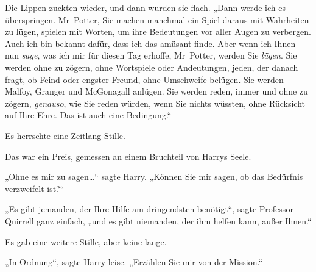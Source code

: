 Die Lippen zuckten wieder, und dann wurden sie flach. „Dann werde ich es überspringen. Mr~Potter, Sie machen manchmal ein Spiel daraus mit Wahrheiten zu lügen, spielen mit Worten, um ihre Bedeutungen vor aller Augen zu verbergen. Auch ich bin bekannt dafür, dass ich das amüsant finde. Aber wenn ich Ihnen nun \emph{sage}, was ich mir für diesen Tag erhoffe, Mr~Potter, werden Sie \emph{lügen}. Sie werden ohne zu zögern, ohne Wortspiele oder Andeutungen, jeden, der danach fragt, ob Feind oder engster Freund, ohne Umschweife belügen. Sie werden Malfoy, Granger und McGonagall anlügen. Sie werden reden, immer und ohne zu zögern, \emph{genauso}, wie Sie reden würden, wenn Sie nichts wüssten, ohne Rücksicht auf Ihre Ehre. Das ist auch eine Bedingung.“

Es herrschte eine Zeitlang Stille.

Das war ein Preis, gemessen an einem Bruchteil von Harrys Seele.

„Ohne es mir zu sagen…“ sagte Harry. „Können Sie mir sagen, ob das Bedürfnis verzweifelt ist?“

„Es gibt jemanden, der Ihre Hilfe am dringendsten benötigt“, sagte Professor Quirrell ganz einfach, „und es gibt niemanden, der ihm helfen kann, außer Ihnen.“

Es gab eine weitere Stille, aber keine lange.

„In Ordnung“, sagte Harry leise. „Erzählen Sie mir von der Mission.“


